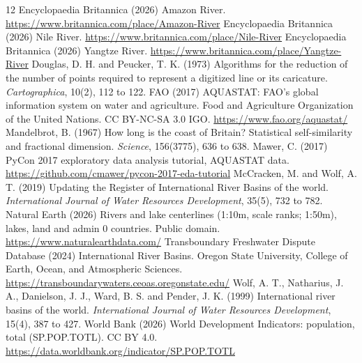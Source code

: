 \documentclass[11pt,a4paper]{article}
\begin{document}
\begin{thebibliography}{12}
 Encyclopaedia Britannica (2026) Amazon River. \url{https://www.britannica.com/place/Amazon-River}
 Encyclopaedia Britannica (2026) Nile River. \url{https://www.britannica.com/place/Nile-River}
 Encyclopaedia Britannica (2026) Yangtze River. \url{https://www.britannica.com/place/Yangtze-River}
 Douglas, D. H. and Peucker, T. K. (1973) Algorithms for the reduction of the number of points required to represent a digitized line or its caricature. \emph{Cartographica}, 10(2), 112 to 122.
 FAO (2017) AQUASTAT: FAO's global information system on water and agriculture. Food and Agriculture Organization of the United Nations. CC BY-NC-SA 3.0 IGO. \url{https://www.fao.org/aquastat/}
 Mandelbrot, B. (1967) How long is the coast of Britain? Statistical self-similarity and fractional dimension. \emph{Science}, 156(3775), 636 to 638.
 Mawer, C. (2017) PyCon 2017 exploratory data analysis tutorial, AQUASTAT data. \url{https://github.com/cmawer/pycon-2017-eda-tutorial}
 McCracken, M. and Wolf, A. T. (2019) Updating the Register of International River Basins of the world. \emph{International Journal of Water Resources Development}, 35(5), 732 to 782.
 Natural Earth (2026) Rivers and lake centerlines (1:10m, scale ranks; 1:50m), lakes, land and admin 0 countries. Public domain. \url{https://www.naturalearthdata.com/}
 Transboundary Freshwater Dispute Database (2024) International River Basins. Oregon State University, College of Earth, Ocean, and Atmospheric Sciences. \url{https://transboundarywaters.ceoas.oregonstate.edu/}
 Wolf, A. T., Natharius, J. A., Danielson, J. J., Ward, B. S. and Pender, J. K. (1999) International river basins of the world. \emph{International Journal of Water Resources Development}, 15(4), 387 to 427.
 World Bank (2026) World Development Indicators: population, total (SP.POP.TOTL). CC BY 4.0. \url{https://data.worldbank.org/indicator/SP.POP.TOTL}
\end{thebibliography}
\end{document}
